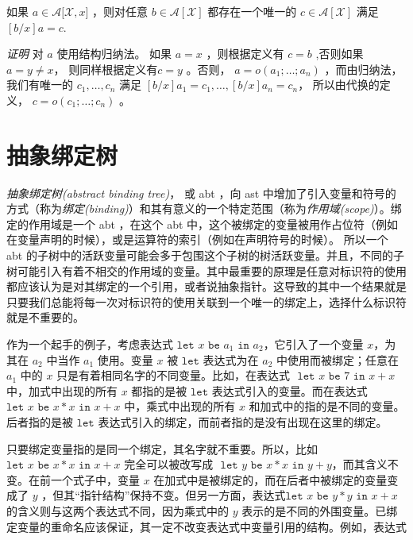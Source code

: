 \begin{theorem}
如果 \(a\in \mathcal{A[X},x]\) ，则对任意
\(b \in \mathcal{A[X]}\) 都存在一个唯一的 \(c\in \mathcal{A[X]}\) 满足
\([b/x]a=c\).
\end{theorem}

\emph{证明} 对 \(a\) 使用结构归纳法。 如果 \(a=x\) ，则根据定义有
\(c=b\) ,否则如果\(a=y\neq x\)， 则同样根据定义有\(c=y\) 。否则，
\(a=o(a_1;\dots;a_n)\) ，而由归纳法，我们有唯一的 \(c_1,\dots,c_n\) 满足
\([b/x]a_1=c_1,\dots,[b/x]a_n=c_n\)， 所以由代换的定义，
\(c=o(c_1;\dots;c_n)\) 。

\section{抽象绑定树}

\emph{抽象绑定树(abstract binding tree)}， 或 abt ，向 ast
中增加了引入变量和符号的方式（称为\emph{绑定(binding)}）和其有意义的一个特定范围（称为\emph{作用域(scope)}）。绑定的作用域是一个
abt ，在这个 abt
中，这个被绑定的变量被用作占位符（例如在变量声明的时候），或是运算符的索引（例如在声明符号的时候）。
所以一个 abt
的子树中的活跃变量可能会多于包围这个子树的树活跃变量。并且，不同的子树可能引入有着不相交的作用域的变量。其中最重要的原理是任意对标识符的使用都应该认为是对其绑定的一个引用，或者说抽象指针。这导致的其中一个结果就是只要我们总能将每一次对标识符的使用关联到一个唯一的绑定上，选择什么标识符就是不重要的。

作为一个起手的例子，考虑表达式
\(\texttt{let } x \texttt{ be } a_1 \texttt{ in } a_2\)，它引入了一个变量
\(x\)，为其在 \(a_2\) 中当作 \(a_1\) 使用。变量 \(x\) 被
\(\texttt{let}\) 表达式为在 \(a_2\) 中使用而被绑定；任意在 \(a_1\) 中的
\(x\) 只是有着相同名字的不同变量。比如，在表达式
\(\texttt{ let } x \texttt{ be } 7 \texttt{ in } x+x \)
中，加式中出现的所有 \(x\) 都指的是被 \(\texttt{let}\)
表达式引入的变量。而在表达式
\(\texttt{let } x \texttt{ be } x * x \texttt{ in } x+x \)
中，乘式中出现的所有 \(x\) 和加式中的指的是不同的变量。后者指的是被
\(\texttt{let}\) 表达式引入的绑定，而前者指的是没有出现在这里的绑定。

只要绑定变量指的是同一个绑定，其名字就不重要。所以，比如
\(\texttt{let } x\texttt{ be } x * x \texttt{ in } x+x\)
完全可以被改写成
\(\texttt{ let } y \texttt{ be } x * x \texttt{ in } y+y \)，而其含义不变。在前一个式子中，变量
\(x\) 在加式中是被绑定的，而在后者中被绑定的变量变成了 \(y\)
，但其``指针结构''保持不变。但另一方面，表达式\(\texttt{let } x\texttt{ be } y * y \texttt{ in } x+x\)
的含义则与这两个表达式不同，因为乘式中的 \(y\)
表示的是不同的外围变量。已绑定变量的重命名应该保证，其一定不改变表达式中变量引用的结构。例如，表达式

